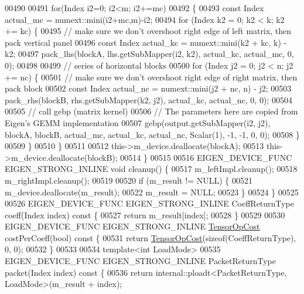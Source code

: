 \begin{DoxyCode}
00490 
00491     \textcolor{keywordflow}{for}(Index i2=0; i2<m; i2+=mc)
00492     \{
00493       \textcolor{keyword}{const} Index actual\_mc = numext::mini(i2+mc,m)-i2;
00494       \textcolor{keywordflow}{for} (Index k2 = 0; k2 < k; k2 += kc) \{
00495         \textcolor{comment}{// make sure we don't overshoot right edge of left matrix, then pack vertical panel}
00496         \textcolor{keyword}{const} Index actual\_kc = numext::mini(k2 + kc, k) - k2;
00497         pack\_lhs(blockA, lhs.getSubMapper(i2, k2), actual\_kc, actual\_mc, 0, 0);
00498 
00499         \textcolor{comment}{// series of horizontal blocks}
00500         \textcolor{keywordflow}{for} (Index j2 = 0; j2 < n; j2 += nc) \{
00501           \textcolor{comment}{// make sure we don't overshoot right edge of right matrix, then pack block}
00502           \textcolor{keyword}{const} Index actual\_nc = numext::mini(j2 + nc, n) - j2;
00503           pack\_rhs(blockB, rhs.getSubMapper(k2, j2), actual\_kc, actual\_nc, 0, 0);
00504 
00505           \textcolor{comment}{// call gebp (matrix kernel)}
00506           \textcolor{comment}{// The parameters here are copied from Eigen's GEMM implementation}
00507           gebp(output.getSubMapper(i2, j2), blockA, blockB, actual\_mc, actual\_kc, actual\_nc, Scalar(1), -1,
       -1, 0, 0);
00508         \}
00509       \}
00510     \}
00511 
00512     this->m\_device.deallocate(blockA);
00513     this->m\_device.deallocate(blockB);
00514   \}
00515 
00516   EIGEN\_DEVICE\_FUNC EIGEN\_STRONG\_INLINE \textcolor{keywordtype}{void} cleanup() \{
00517     m\_leftImpl.cleanup();
00518     m\_rightImpl.cleanup();
00519 
00520     \textcolor{keywordflow}{if} (m\_result != NULL) \{
00521       m\_device.deallocate(m\_result);
00522       m\_result = NULL;
00523     \}
00524   \}
00525 
00526   EIGEN\_DEVICE\_FUNC EIGEN\_STRONG\_INLINE CoeffReturnType coeff(Index index)\textcolor{keyword}{ const }\{
00527     \textcolor{keywordflow}{return} m\_result[index];
00528   \}
00529 
00530   EIGEN\_DEVICE\_FUNC EIGEN\_STRONG\_INLINE \hyperlink{class_eigen_1_1_tensor_op_cost}{TensorOpCost} costPerCoeff(\textcolor{keywordtype}{bool})\textcolor{keyword}{ const }\{
00531     \textcolor{keywordflow}{return} \hyperlink{class_eigen_1_1_tensor_op_cost}{TensorOpCost}(\textcolor{keyword}{sizeof}(CoeffReturnType), 0, 0);
00532   \}
00533 
00534   \textcolor{keyword}{template}<\textcolor{keywordtype}{int} LoadMode>
00535   EIGEN\_DEVICE\_FUNC EIGEN\_STRONG\_INLINE PacketReturnType packet(Index index)\textcolor{keyword}{ const }\{
00536     \textcolor{keywordflow}{return} internal::ploadt<PacketReturnType, LoadMode>(m\_result + index);

\end{DoxyCode}
